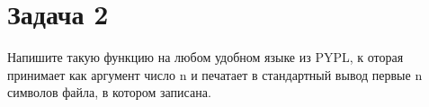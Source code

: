 \section{Задача 2}
Напишите такую функцию на любом удобном языке из PYPL, к
оторая принимает как аргумент число n и печатает в
стандартный вывод первые n символов файла,
в котором записана.
